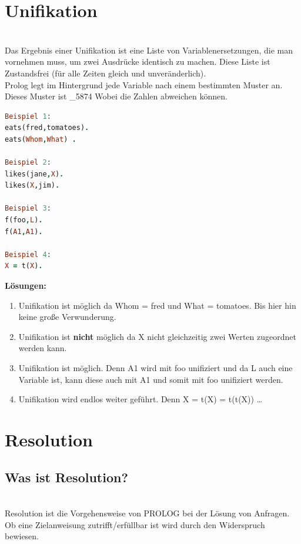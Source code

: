 \section{Unifikation}\label{sec:unifikation}\qquad\\
Das Ergebnis einer Unifikation ist eine Liste von Variablenersetzungen, die man vornehmen muss, um zwei Ausdrücke identisch zu machen. Diese Liste ist Zustandsfrei (für alle Zeiten gleich und unveränderlich).\\ Prolog legt im Hintergrund jede Variable nach einem bestimmten Muster an. Dieses Muster ist \_5874 Wobei die Zahlen abweichen können. 
\begin{lstlisting}[language=Prolog] 
Beispiel 1:
eats(fred,tomatoes).
eats(Whom,What) .

Beispiel 2:
likes(jane,X).
likes(X,jim).

Beispiel 3:
f(foo,L).
f(A1,A1).

Beispiel 4:
X = t(X).
\end{lstlisting}\newpage
\textbf{Lösungen:}\qquad\\
\begin{enumerate}
	\item Unifikation ist möglich da Whom = fred und What = tomatoes. Bis hier hin keine große Verwunderung.
	\item Unifikation ist \textbf{nicht} möglich da X nicht gleichzeitig zwei Werten zugeordnet werden kann.
	\item Unifikation ist möglich. Denn A1 wird mit foo unifiziert und da L auch eine Variable ist, kann diese auch mit A1 und somit mit foo unifiziert werden. 
	\item Unifikation wird endlos weiter geführt. Denn X = t(X) = t(t(X)) \dots
\end{enumerate}
\section{Resolution}
\subsection{Was ist Resolution?}\qquad\\
Resolution ist die Vorgehensweise von PROLOG bei der Lösung von Anfragen.\\
Ob eine Zielanweisung zutrifft/erfüllbar ist wird durch den Widerspruch bewiesen. 
